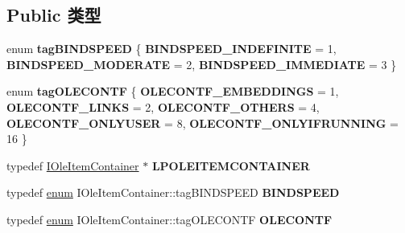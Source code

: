 \subsection*{Public 类型}
\begin{DoxyCompactItemize}
\item 
\mbox{\label{interface_i_ole_item_container_ac103f2edc91b88d7d9efc71f7201aa8a}} 
enum {\bfseries tag\+B\+I\+N\+D\+S\+P\+E\+ED} \{ {\bfseries B\+I\+N\+D\+S\+P\+E\+E\+D\+\_\+\+I\+N\+D\+E\+F\+I\+N\+I\+TE} = 1, 
{\bfseries B\+I\+N\+D\+S\+P\+E\+E\+D\+\_\+\+M\+O\+D\+E\+R\+A\+TE} = 2, 
{\bfseries B\+I\+N\+D\+S\+P\+E\+E\+D\+\_\+\+I\+M\+M\+E\+D\+I\+A\+TE} = 3
 \}
\item 
\mbox{\label{interface_i_ole_item_container_ae4500cdafc9a266a817532989b1674b7}} 
enum {\bfseries tag\+O\+L\+E\+C\+O\+N\+TF} \{ \newline
{\bfseries O\+L\+E\+C\+O\+N\+T\+F\+\_\+\+E\+M\+B\+E\+D\+D\+I\+N\+GS} = 1, 
{\bfseries O\+L\+E\+C\+O\+N\+T\+F\+\_\+\+L\+I\+N\+KS} = 2, 
{\bfseries O\+L\+E\+C\+O\+N\+T\+F\+\_\+\+O\+T\+H\+E\+RS} = 4, 
{\bfseries O\+L\+E\+C\+O\+N\+T\+F\+\_\+\+O\+N\+L\+Y\+U\+S\+ER} = 8, 
\newline
{\bfseries O\+L\+E\+C\+O\+N\+T\+F\+\_\+\+O\+N\+L\+Y\+I\+F\+R\+U\+N\+N\+I\+NG} = 16
 \}
\item 
\mbox{\label{interface_i_ole_item_container_a692e62c3f1d974f8b5378e5b1e843964}} 
typedef \hyperlink{interface_i_ole_item_container}{I\+Ole\+Item\+Container} $\ast$ {\bfseries L\+P\+O\+L\+E\+I\+T\+E\+M\+C\+O\+N\+T\+A\+I\+N\+ER}
\item 
\mbox{\label{interface_i_ole_item_container_a0c7905d267097934d4c4c65eaeb5f3c3}} 
typedef \hyperlink{interfaceenum}{enum} I\+Ole\+Item\+Container\+::tag\+B\+I\+N\+D\+S\+P\+E\+ED {\bfseries B\+I\+N\+D\+S\+P\+E\+ED}
\item 
\mbox{\label{interface_i_ole_item_container_a1aef2ace6664aa143cf7f600263d3654}} 
typedef \hyperlink{interfaceenum}{enum} I\+Ole\+Item\+Container\+::tag\+O\+L\+E\+C\+O\+N\+TF {\bfseries O\+L\+E\+C\+O\+N\+TF}
\end{DoxyCompactItemize}
